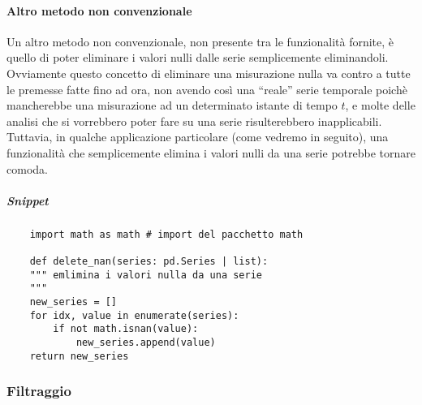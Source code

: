 \paragraph{Altro metodo non convenzionale}
Un altro metodo non convenzionale, non presente tra le funzionalità fornite,
è quello di poter eliminare i valori nulli dalle serie semplicemente
eliminandoli. Ovviamente questo concetto di eliminare una misurazione nulla va
contro a tutte le premesse fatte fino ad ora, non avendo così una ``reale''
serie temporale poichè mancherebbe una misurazione ad un determinato istante di tempo
$t$, e molte delle analisi che si vorrebbero poter fare su una serie risulterebbero
inapplicabili. 
Tuttavia, in qualche applicazione particolare (come vedremo in seguito), una funzionalità
che semplicemente elimina i valori nulli da una serie potrebbe tornare comoda.
\subparagraph*{Snippet}
\begin{verbatim}
    import math as math # import del pacchetto math
    
    def delete_nan(series: pd.Series | list):
    """ emlimina i valori nulla da una serie
    """
    new_series = []
    for idx, value in enumerate(series):
        if not math.isnan(value):
            new_series.append(value)
    return new_series
\end{verbatim}


\subsubsection{Filtraggio}

